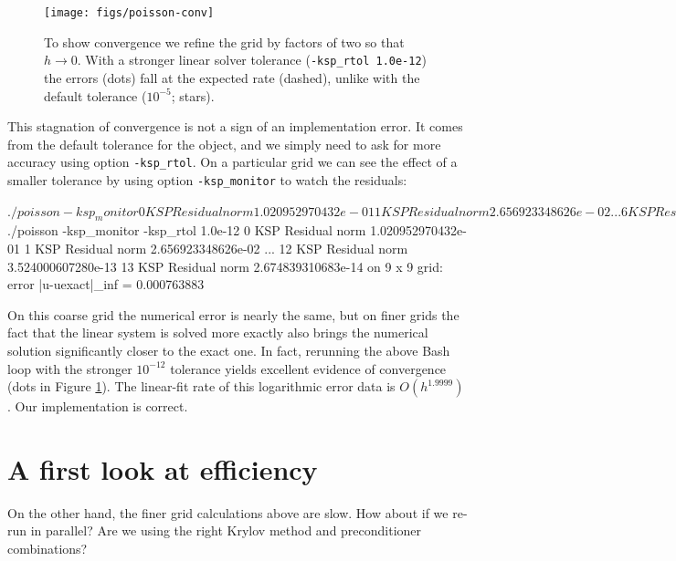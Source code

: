 \begin{figure}
\bigskip
\texttt{[image: figs/poisson-conv]}
\caption{To show convergence we refine the \pDM grid by factors of two so that $h\to 0$.  With a stronger linear solver tolerance (\texttt{-ksp\_rtol 1.0e-12}) the errors (dots) fall at the expected rate (dashed), unlike with the default tolerance ($10^{-5}$; stars).}
\label{fig:poisson-conv}
\end{figure}

This stagnation of convergence is not a sign of an implementation error.  It comes from the default tolerance for the \pKSP object, and we simply need to ask for more accuracy using option \texttt{-ksp\_rtol}.  On a particular grid we can see the effect of a smaller tolerance by using option \texttt{-ksp\_monitor} to watch the residuals:
\begin{cline}
$ ./poisson -ksp_monitor
  0 KSP Residual norm 1.020952970432e-01 
  1 KSP Residual norm 2.656923348626e-02 
...
  6 KSP Residual norm 2.152764600588e-06 
  7 KSP Residual norm 2.650467236964e-07 
on 9 x 9 grid:  error |u-uexact|_inf = 0.000763959
$ ./poisson -ksp_monitor -ksp_rtol 1.0e-12
  0 KSP Residual norm 1.020952970432e-01 
  1 KSP Residual norm 2.656923348626e-02 
...
 12 KSP Residual norm 3.524000607280e-13 
 13 KSP Residual norm 2.674839310683e-14 
on 9 x 9 grid:  error |u-uexact|_inf = 0.000763883
\end{cline}
On this coarse grid the numerical error is nearly the same, but on finer grids the fact that the linear system is solved more exactly also brings the numerical solution significantly closer to the exact one.  In fact, rerunning the above Bash loop with the stronger $10^{-12}$ tolerance yields excellent evidence of convergence (dots in Figure \ref{fig:poisson-conv}).  The linear-fit rate of this logarithmic error data is $O(h^{1.9999})$.  Our implementation is correct.


\section{A first look at efficiency}

On the other hand, the finer grid calculations above are slow.  How about if we re-run in parallel?  Are we using the right Krylov method and preconditioner combinations?

